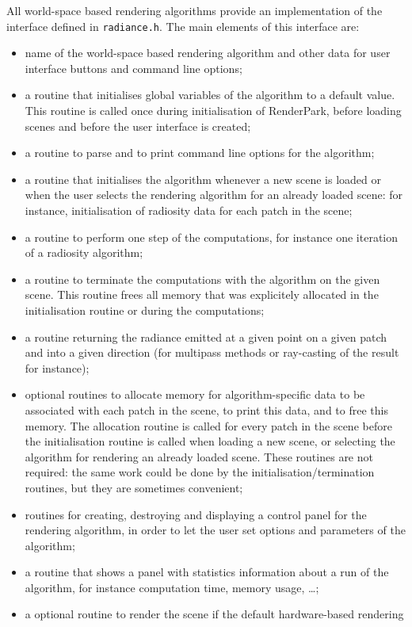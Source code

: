 \documentclass[11pt]{report}
\begin{document}
All world-space based rendering algorithms provide an implementation of the 
interface defined in {\tt radiance.h}. The main elements of this interface
are:
\begin{itemize}
\item	name of the world-space based rendering algorithm and other data for
	user interface buttons and command line options;
\item	a routine that initialises global variables of the algorithm to 
	a default value. This routine is called once during initialisation of
	RenderPark, before loading scenes and before the user interface is created;
\item	a routine to parse and to print command line options for the algorithm;
\item	a routine that initialises the algorithm whenever a new scene is loaded
	or when the user selects the rendering algorithm for an already loaded scene:
	for instance, initialisation of radiosity data for each patch in the scene;
\item	a routine to perform one step of the computations, for instance one iteration
	of a radiosity algorithm;
\item	a routine to terminate the computations with the algorithm on the given scene.
	This routine frees all memory that was explicitely allocated in the 
	initialisation routine or during the computations;
\item	a routine returning the radiance emitted at a given point on a given patch
	and into a given direction (for multipass methods or ray-casting of the result
	for instance);
\item	optional 
	routines to allocate memory for algorithm-specific data to be associated
	with each patch in the scene, to print this data, and to free this memory.
	The allocation routine is called for every patch in the scene before the
	initialisation routine is called when loading a new scene, or selecting
	the algorithm for rendering an already loaded scene. These routines
	are not required: the same work could be done by the
	initialisation/termination routines, but they are sometimes convenient;
\item	routines for creating, destroying and displaying a control panel for the
	rendering algorithm, in order to let the user set options and parameters
	of the algorithm;
\item	a routine that shows a panel with statistics information about a run of
	the algorithm, for instance computation time, memory usage, \ldots;
\item	a optional routine to render the scene if the default hardware-based rendering

\end{itemize}
\end{document}
